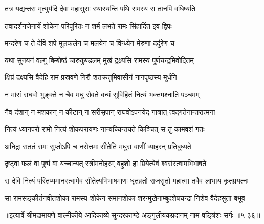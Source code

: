 \twolineshloka
{तत्र यद्यन्तरा मृत्युर्यदि देवा महासुराः}
{स्थास्यन्ति पथि रामस्य स तानपि वधिष्यति} %

\twolineshloka
{तवादर्शनजेनार्ये शोकेन परिपूरितः}
{न शर्म लभते रामः सिंहार्दित इव द्विपः} %

\twolineshloka
{मन्दरेण च ते देवि शपे मूलफलेन च}
{मलयेन च विन्ध्येन मेरुणा दर्दुरेण च} %

\twolineshloka
{यथा सुनयनं वल्गु बिम्बोष्ठं चारुकुण्डलम्}
{मुखं द्रक्ष्यसि रामस्य पूर्णचन्द्रमिवोदितम्} %

\twolineshloka
{क्षिप्रं द्रक्ष्यसि वैदेहि रामं प्रस्रवणे गिरौ}
{शतक्रतुमिवासीनं नागपृष्ठस्य मूर्धनि} %

\twolineshloka
{न मांसं राघवो भुङ्क्ते न चैव मधु सेवते}
{वन्यं सुविहितं नित्यं भक्तमश्नाति पञ्चमम्} %

\twolineshloka
{नैव दंशान् न मशकान् न कीटान् न सरीसृपान्}
{राघवोऽपनयेद् गात्रात् त्वद्गतेनान्तरात्मना} %

\twolineshloka
{नित्यं ध्यानपरो रामो नित्यं शोकपरायणः}
{नान्यच्चिन्तयते किञ्चित् स तु कामवशं गतः} %

\twolineshloka
{अनिद्रः सततं रामः सुप्तोऽपि च नरोत्तमः}
{सीतेति मधुरां वाणीं व्याहरन् प्रतिबुध्यते} %

\twolineshloka
{दृष्ट्वा फलं वा पुष्पं वा यच्चान्यत् स्त्रीमनोहरम्}
{बहुशो हा प्रियेत्येवं श्वसंस्त्वामभिभाषते} %

\twolineshloka
{स देवि नित्यं परितप्यमानस्त्वामेव सीतेत्यभिभाषमाणः}
{धृतव्रतो राजसुतो महात्मा तवैव लाभाय कृतप्रयत्नः} %

\twolineshloka
{सा रामसङ्कीर्तनवीतशोका रामस्य शोकेन समानशोका}
{शरन्मुखेनाम्बुदशेषचन्द्रा निशेव वैदेहसुता बभूव} %


॥इत्यार्षे श्रीमद्रामायणे वाल्मीकीये आदिकाव्ये सुन्दरकाण्डे अङ्गुलीयकप्रदानम् नाम षड्त्रिंशः सर्गः ॥५-३६॥
